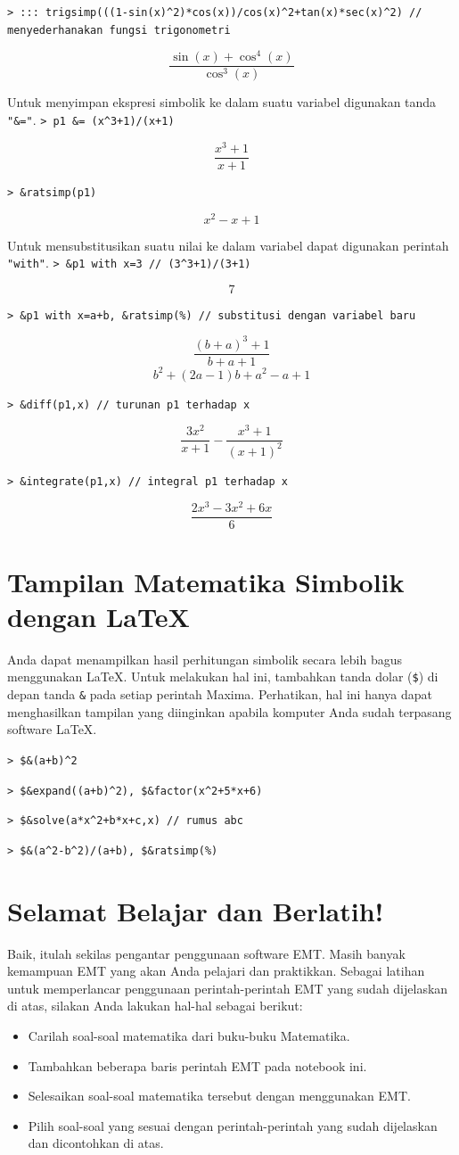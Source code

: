 \documentclass[11pt, a4paper]{article}
\newcommand{\emtcmd}[1]{\noindent\texttt{\textcolor{emtcommand}{>}\ #1}\par\smallskip}
\begin{document}
\emtcmd{::: trigsimp(((1-sin(x)\^{}2)*cos(x))/cos(x)\^{}2+tan(x)*sec(x)\^{}2) \textcolor{emtcomment}{// menyederhanakan fungsi trigonometri}}
$$\frac{\sin(x) + \cos^4(x)}{\cos^3(x)}$$

Untuk menyimpan ekspresi simbolik ke dalam suatu variabel digunakan tanda \texttt{"\&="}.
\emtcmd{p1 \&= (x\^{}3+1)/(x+1)}
$$\frac{x^3 + 1}{x + 1}$$

\emtcmd{\&ratsimp(p1)}
$$x^2 - x + 1$$

Untuk mensubstitusikan suatu nilai ke dalam variabel dapat digunakan perintah \texttt{"with"}.
\emtcmd{\&p1 with x=3 \textcolor{emtcomment}{// (3\^{}3+1)/(3+1)}}
$$7$$

\emtcmd{\&p1 with x=a+b, \&ratsimp(\%) \textcolor{emtcomment}{// substitusi dengan variabel baru}}
$$\frac{(b + a)^3 + 1}{b + a + 1}$$
$$b^2 + (2a - 1)b + a^2 - a + 1$$

\emtcmd{\&diff(p1,x) \textcolor{emtcomment}{// turunan p1 terhadap x}}
$$\frac{3x^2}{x + 1} - \frac{x^3 + 1}{(x + 1)^2}$$

\emtcmd{\&integrate(p1,x) \textcolor{emtcomment}{// integral p1 terhadap x}}
$$\frac{2x^3 - 3x^2 + 6x}{6}$$

\section*{Tampilan Matematika Simbolik dengan LaTeX}

Anda dapat menampilkan hasil perhitungan simbolik secara lebih bagus menggunakan LaTeX. Untuk melakukan hal ini, tambahkan tanda dolar (\texttt{\$}) di depan tanda \texttt{\&} pada setiap perintah Maxima. Perhatikan, hal ini hanya dapat menghasilkan tampilan yang diinginkan apabila komputer Anda sudah terpasang software LaTeX.

\emtcmd{\$\&(a+b)\^{}2}
\emtcmd{\$\&expand((a+b)\^{}2), \$\&factor(x\^{}2+5*x+6)}
\emtcmd{\$\&solve(a*x\^{}2+b*x+c,x) \textcolor{emtcomment}{// rumus abc}}
\emtcmd{\$\&(a\^{}2-b\^{}2)/(a+b), \$\&ratsimp(\%)}

\section*{Selamat Belajar dan Berlatih!}

Baik, itulah sekilas pengantar penggunaan software EMT. Masih banyak kemampuan EMT yang akan Anda pelajari dan praktikkan. Sebagai latihan untuk memperlancar penggunaan perintah-perintah EMT yang sudah dijelaskan di atas, silakan Anda lakukan hal-hal sebagai berikut:

\begin{itemize}
    \item Carilah soal-soal matematika dari buku-buku Matematika.
    \item Tambahkan beberapa baris perintah EMT pada notebook ini.
    \item Selesaikan soal-soal matematika tersebut dengan menggunakan EMT.
    \item Pilih soal-soal yang sesuai dengan perintah-perintah yang sudah dijelaskan dan dicontohkan di atas.
\end{itemize}
\end{document}

